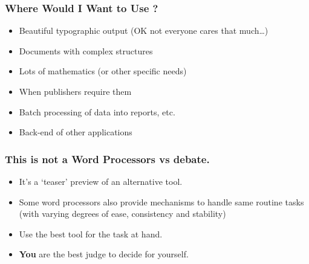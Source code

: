 \begin{frame}
\begin{itemize}
\begin{columns}[T]
\begin{column}{.48\linewidth}
\end{column}
\begin{column}{.48\linewidth}
%
\end{column}
\end{columns}

\end{itemize}
\end{frame}

\begin{frame}
\frametitle{Where Would I Want to Use ?}
\begin{itemize}
\item Beautiful typographic output \pause(OK not everyone cares that much\ldots)
\item Documents with complex structures
\item Lots of mathematics \pause(or other specific needs)\pause
\item When publishers \alert{require} them
\item Batch processing of data into reports, etc.
\pause
\item Back-end of other applications
\end{itemize}
\end{frame}

\begin{frame}
\frametitle{This is not a Word Processors vs  debate.}
\begin{itemize}
\item It's a `teaser' preview of an alternative tool.
\item Some word processors also provide mechanisms to handle same routine tasks (with varying degrees of ease, consistency and stability)
\item Use the best tool for the task at hand.
\item \textbf{\alert{You}} are the best judge to decide for yourself.
\end{itemize}
\end{frame}



